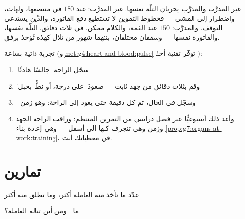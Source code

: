 \begin{example}\label{ex:g7:organs-at-work:runners}
غير المدرَّب والمدرَّب يجريان التلّة نفسها. غير المدرَّب:  عند
$180$ في منتصفها، ولهاث، واضطرار إلى المشي --- فخطوط التموين لا
تستطيع دفع الفاتورة، والدَّين يستدعي التوقف. والمدرَّب:  $150$
عند القمة، والكلام ممكن،  في ثلاث دقائق. التلّة نفسها،
والفاتورة نفسها --- وسقفان مختلفان، بنتهما شهور من تلال كهذه
تُؤخذ برفق.
\end{example}

\begin{method}\label{met:g7:organs-at-work:read}
تجربة ذاتية بساعة
(و\cref{met:g4:heart-and-blood:pulse} توفّر تقنية أخذ
):
\begin{enumerate}
  \item سجّل  الراحة، جالسًا هادئًا؛
  \item وقم بثلاث دقائق من جهد ثابت --- صعودًا على درجة، أو نطًّا
        بحبل؛
  \item وسجّل  في الحال، ثم كل دقيقة حتى يعود إلى الراحة:
        وهو زمن ؛
  \item وأعد ذلك أسبوعيًّا عبر فصل دراسي من التمرين المنتظم:
        وراقب  الراحة  الجهد وزمن  وهي تنجرف كلها
        إلى أسفل --- وهي إعادة بناء
        \cref{prop:g7:organs-at-work:training}، في معطياتك أنت.
\end{enumerate}
\end{method}

\section{تمارين}

\begin{exercise}[$\star$]\label{exo:g7:organs-at-work:1}
عدّد ما تأخذ منه  العاملة أكثر، وما تطلق منه أكثر.
\end{exercise}

\begin{exercise}[$\star$]\label{exo:g7:organs-at-work:2}
ما ، ومن أين تناله  العاملة؟
\end{exercise}


